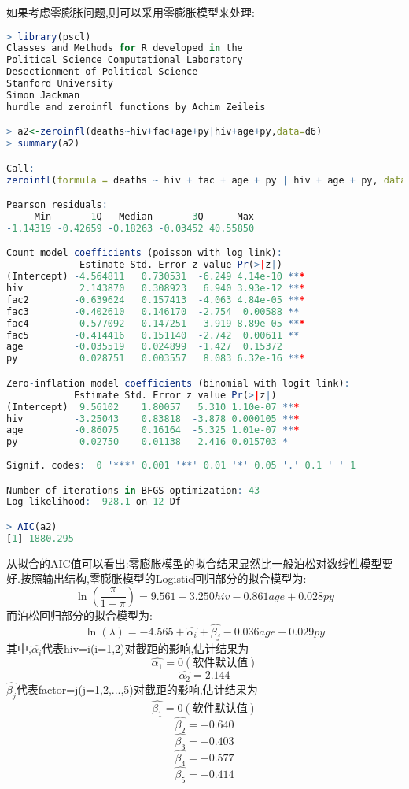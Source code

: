 \documentclass[11pt,a4paper,oneside]{book}
\begin{document}
如果考虑零膨胀问题,则可以采用零膨胀模型来处理:
\begin{lstlisting}[language=r]
> library(pscl)
Classes and Methods for R developed in the
Political Science Computational Laboratory
Desectionment of Political Science
Stanford University
Simon Jackman
hurdle and zeroinfl functions by Achim Zeileis

> a2<-zeroinfl(deaths~hiv+fac+age+py|hiv+age+py,data=d6)
> summary(a2)

Call:
zeroinfl(formula = deaths ~ hiv + fac + age + py | hiv + age + py, data = d6)

Pearson residuals:
     Min       1Q   Median       3Q      Max 
-1.14319 -0.42659 -0.18263 -0.03452 40.55850 

Count model coefficients (poisson with log link):
             Estimate Std. Error z value Pr(>|z|)    
(Intercept) -4.564811   0.730531  -6.249 4.14e-10 ***
hiv          2.143870   0.308923   6.940 3.93e-12 ***
fac2        -0.639624   0.157413  -4.063 4.84e-05 ***
fac3        -0.402610   0.146170  -2.754  0.00588 ** 
fac4        -0.577092   0.147251  -3.919 8.89e-05 ***
fac5        -0.414416   0.151140  -2.742  0.00611 ** 
age         -0.035519   0.024899  -1.427  0.15372    
py           0.028751   0.003557   8.083 6.32e-16 ***

Zero-inflation model coefficients (binomial with logit link):
            Estimate Std. Error z value Pr(>|z|)    
(Intercept)  9.56102    1.80057   5.310 1.10e-07 ***
hiv         -3.25043    0.83818  -3.878 0.000105 ***
age         -0.86075    0.16164  -5.325 1.01e-07 ***
py           0.02750    0.01138   2.416 0.015703 *  
---
Signif. codes:  0 '***' 0.001 '**' 0.01 '*' 0.05 '.' 0.1 ' ' 1 

Number of iterations in BFGS optimization: 43 
Log-likelihood: -928.1 on 12 Df

> AIC(a2)
[1] 1880.295
\end{lstlisting}

从拟合的AIC值可以看出:零膨胀模型的拟合结果显然比一般泊松对数线性模型要好.按照输出结构,零膨胀模型的Logistic回归部分的拟合模型为:
\[\ln(\frac{\pi}{1-\pi})=9.561-3.250hiv-0.861age+0.028py\]
而泊松回归部分的拟合模型为:
\[\ln(\lambda)=-4.565+\hat{\alpha_i}+\hat{\beta_j}-0.036age+0.029py\]
其中,$ \hat{\alpha_i} $代表hiv=i(i=1,2)对截距的影响,估计结果为
\[\hat{\alpha_1}=0(\mbox{软件默认值})\]
\[\hat{\alpha_2}=2.144\]
$ \hat{\beta_j} $代表factor=j(j=1,2,...,5)对截距的影响,估计结果为
\[\hat{\beta_1}=0(\mbox{软件默认值})\]
\[\hat{\beta_2}=-0.640\]
\[\hat{\beta_3}=-0.403\]
\[\hat{\beta_4}=-0.577\]
\[\hat{\beta_5}=-0.414\]
\end{document}
